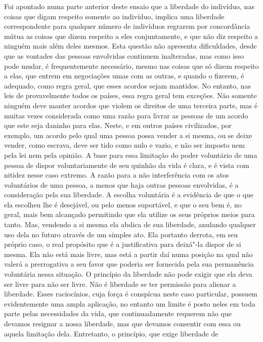 Foi apontado numa parte anterior deste ensaio que a liberdade do
indivíduo, nas coisas que digam respeito somente ao indivíduo, implica
uma liberdade correspondente para qualquer número de indivíduos
regrarem por concordância mútua as coisas que dizem respeito a eles
conjuntamente, e que não diz respeito a ninguém mais além deles mesmos.
Esta questão não apresenta dificuldades, desde que as vontades das
pessoas envolvidas continuem inalteradas, mas como isso pode
mudar, é frequentemente necessário, mesmo nas coisas que só dizem
respeito a elas, que entrem em negociações umas com as outras, e
quando o fizerem, é adequado, como regra geral, que esses acordos sejam
mantidos. No entanto, nas leis de provavelmente todos os países, essa
regra geral tem exceções. Não somente ninguém deve manter acordos que
violem os direitos de uma terceira parte, mas é muitas vezes
considerada como uma razão para livrar as pessoas de um acordo
que este seja daninho para elas. Neste, e em outros países civilizados,
por exemplo, um acordo pelo qual uma pessoa possa vender a si mesma, ou
se deixe vender, como escrava, deve ser tido como nulo e vazio, e não
ser imposto nem pela lei nem pela opinião. A base para essa limitação
do poder voluntário de uma pessoa de dispor voluntariamente de seu
quinhão da vida é clara, e é vista com nitidez nesse caso extremo. A
razão para a não interferência com os atos voluntários de uma pessoa, a
menos que haja outras pessoas envolvidas, é a consideração pela sua
liberdade. A escolha voluntária é a evidência de que o que ela escolheu
lhe é desejável, ou pelo menos suportável, e que o seu bem é, no geral,
mais bem alcançado permitindo que ela utilize os seus próprios meios para
tanto. Mas, vendendo a si mesma ela abdica de sua liberdade,
anulando qualquer uso dela no futuro através de um simples ato.
Ela portanto derrota, em seu próprio caso, o real propósito que é a
justificativa para deixá"-la dispor de si mesma. Ela não está mais
livre, mas está a partir daí numa posição na qual não valerá a
prerrogativa a seu favor que poderia ser fornecida pela sua permanência
voluntária nessa situação. O princípio da liberdade não pode exigir que
ela deva ser livre para não ser livre. Não é liberdade se ter permissão
para alienar a liberdade. Esses raciocínios, cuja força é
conspícua neste caso particular, possuem evidentemente uma ampla
aplicação, no entanto um limite é posto neles em toda parte pelas
necessidades da vida, que continuadamente requerem não que devamos
resignar a nossa liberdade, mas que devamos consentir com essa ou
aquela limitação dela. Entretanto, o princípio, que exige liberdade de
